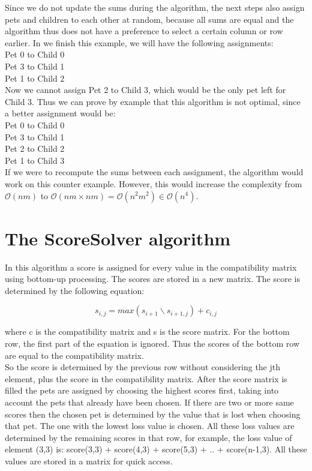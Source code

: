 \documentclass[paper=a4, fontsize=11pt]{scrartcl} %
\numberwithin{equation}{section} %
\numberwithin{figure}{section} %
\numberwithin{table}{section} %
\begin{document}
Since we do not update the sums during the algorithm, the next steps also assign pets and children to each other at random, because all sums are equal and the algorithm thus does not have a preference to select a certain column or row earlier.
In we finish this example, we will have the following assignments:\\

Pet 0 to Child 0\\
Pet 3 to Child 1\\
Pet 1 to Child 2\\

Now we cannot assign Pet 2 to Child 3, which would be the only pet left for Child 3. Thus we can prove by example that this algorithm is not optimal, since a better assignment would be:\\

Pet 0 to Child 0\\
Pet 3 to Child 1\\
Pet 2 to Child 2\\
Pet 1 to Child 3\\

If we were to recompute the sums between each assignment, the algorithm would work on this counter example.
However, this would increase the complexity from $\mathcal{O}(nm)$ to $\mathcal{O}(nm \times nm) = \mathcal{O}(n^2m^2) \in \mathcal{O}(n^4)$.

\section{The ScoreSolver algorithm}
In this algorithm a score is assigned for every value in the compatibility matrix using bottom-up processing.
The scores are stored in a new matrix.
The score is determined by the following equation:

\begin{equation}
	s_{i,j} = max(s_{i+1} \backslash s_{i+1,j}) + c_{i,j}
	\label{eq}
\end{equation}

where c is the compatibility matrix and s is the score matrix. For the bottom row, the first part of the equation is ignored. Thus the scores of the bottom row are equal to the compatibility matrix.\\

So the score is determined by the previous row without considering the jth element, plus the score in the compatibility matrix.
After the score matrix is filled the pets are assigned by choosing the highest scores first, taking into account the pets that already have been chosen.
If there are two or more same scores then the chosen pet is determined by the value that is lost when choosing that pet.
The one with the lowest loss value is chosen.
All these loss values are determined by the remaining scores in that row, for example, the loss value of element (3,3) is: score(3,3) + score(4,3) + score(5,3) + .. + score(n-1,3).
All these values are stored in a matrix for quick access.
\end{document}
